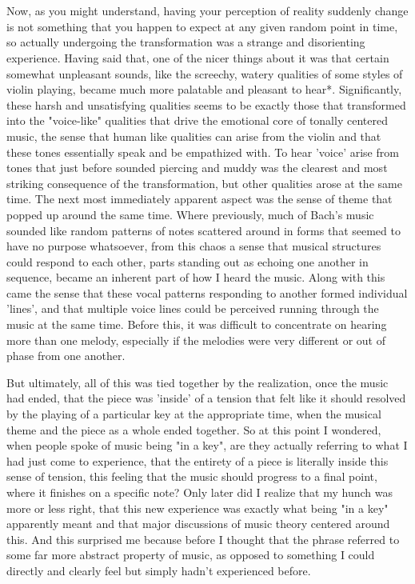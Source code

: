 \documentclass[]{article}
\begin{document}
\section{}

Now, as you might understand, having your perception of reality suddenly change is not something that you happen to expect at any given random point in time, so actually undergoing the transformation was a strange and disorienting experience. Having said that, one of the nicer things about it was that certain somewhat unpleasant sounds, like the screechy, watery qualities of some styles of violin playing, became much more palatable and pleasant to hear*. Significantly, these harsh and unsatisfying qualities seems to be exactly those that transformed into the "voice-like" qualities that drive the emotional core of tonally centered music, the sense that human like qualities can arise from the violin and that these tones essentially speak and be empathized with. To hear 'voice' arise from tones that just before sounded piercing and muddy was the clearest and most striking consequence of the transformation, but other qualities arose at the same time. The next most immediately apparent aspect was the sense of theme that popped up around the same time. Where previously, much of Bach's music sounded like random patterns of notes scattered around in forms that seemed to have no purpose whatsoever, from this chaos a sense that musical structures could respond to each other, parts standing out as echoing one another in sequence, became an inherent part of how I heard the music. Along with this came the sense that these vocal patterns responding to another formed individual 'lines', and that multiple voice lines could be perceived running through the music at the same time. Before this, it was difficult to concentrate on hearing more than one melody, especially if the melodies were very different or out of phase from one another.

But ultimately, all of this was tied together by the realization, once the music had ended, that the piece was 'inside' of a tension that felt like it should resolved by the playing of a particular key at the appropriate time, when the musical theme and the piece as a whole ended together. So at this point I wondered, when people spoke of music being "in a key", are they actually referring to what I had just come to experience, that the entirety of a piece is literally inside this sense of tension, this feeling that the music should progress to a final point, where it finishes on a specific note? Only later did I realize that my hunch was more or less right, that this new experience was exactly what being "in a key" apparently meant and that major discussions of music theory centered around this. And this surprised me because before I thought that the phrase referred to some far more abstract property of music, as opposed to something I could directly and clearly feel but simply hadn't experienced before.
\end{document}

